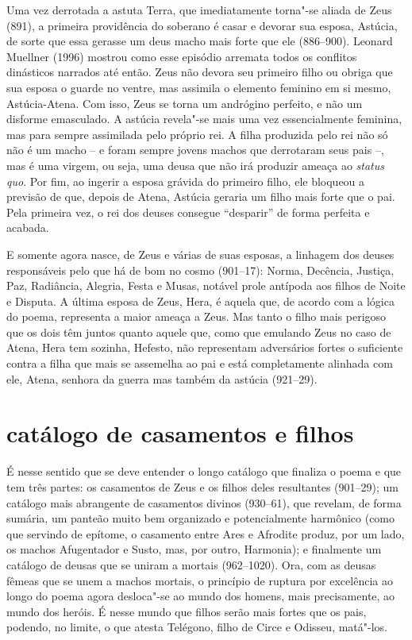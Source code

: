 Uma vez derrotada a astuta Terra, que imediatamente torna"-se aliada de Zeus
(891), a primeira providência do soberano é casar e devorar sua esposa,
Astúcia, de sorte que essa gerasse um deus macho mais forte que ele
(886--900). Leonard Muellner (1996) mostrou como esse episódio arremata todos os
conflitos dinásticos narrados até então. Zeus não devora seu primeiro filho ou
obriga que sua esposa o guarde no ventre, mas assimila o elemento feminino em
si mesmo, Astúcia-Atena. Com isso, Zeus se torna um andrógino perfeito, e não
um disforme emasculado. A astúcia revela"-se mais uma vez essencialmente
feminina, mas para sempre assimilada pelo próprio rei. A filha produzida pelo
rei não só não é um macho – e foram sempre jovens machos que derrotaram seus
pais –, mas é uma virgem, ou seja, uma deusa que não irá produzir ameaça ao
\textit{status quo}. Por fim, ao ingerir a esposa grávida do primeiro filho, ele
bloqueou a previsão de que, depois de Atena, Astúcia geraria um filho mais
forte que o pai. Pela primeira vez, o rei dos deuses consegue “desparir” de
forma perfeita e acabada.

E somente agora nasce, de Zeus e várias de suas esposas, a linhagem dos deuses
responsáveis pelo que há de bom no cosmo (901--17): Norma, Decência, Justiça,
Paz, Radiância, Alegria, Festa e Musas, notável prole antípoda aos filhos de
Noite e Disputa. A última esposa de Zeus, Hera, é aquela que, de acordo com a
lógica do poema, representa a maior ameaça a Zeus. Mas tanto o filho mais
perigoso que os dois têm juntos quanto aquele que, como que emulando Zeus no
caso de Atena, Hera tem sozinha, Hefesto, não representam adversários fortes o
suficiente contra a filha que mais se assemelha ao pai e está completamente
alinhada com ele, Atena, senhora da guerra mas também da astúcia (921--29).

\section{catálogo de casamentos e filhos}

É nesse sentido que se deve entender o longo catálogo que finaliza o poema e
que tem três partes: os casamentos de Zeus e os filhos deles resultantes
(901--29); um catálogo mais abrangente de casamentos divinos (930--61), que
revelam, de forma sumária, um panteão muito bem organizado e potencialmente
harmônico (como que servindo de epítome, o casamento entre Ares e Afrodite
produz, por um lado, os machos Afugentador e Susto, mas, por outro, Harmonia);
e finalmente um catálogo de deusas que se uniram a mortais (962--1020). Ora,
com as deusas fêmeas que se unem a machos mortais, o princípio de ruptura por
excelência ao longo do poema agora desloca"-se ao mundo dos homens, mais
precisamente, ao mundo dos heróis. É nesse mundo que filhos serão mais fortes
que os pais, podendo, no limite, o que atesta Telégono, filho de Circe e
Odisseu, matá"-los.

